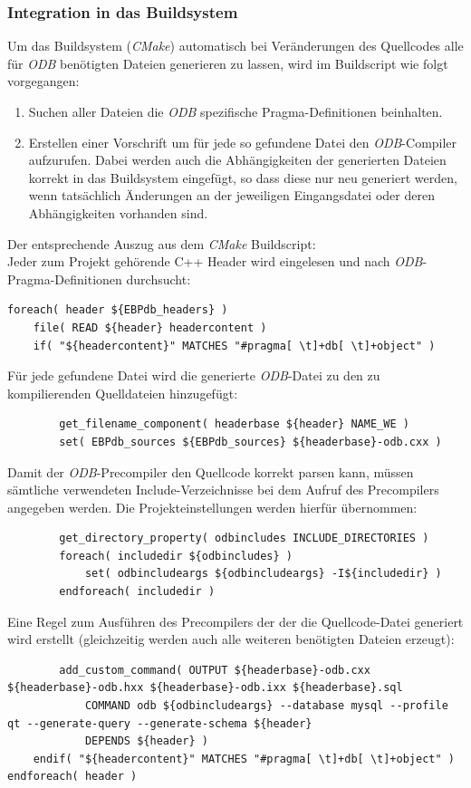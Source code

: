 \subsubsection{Integration in das Buildsystem}
Um das Buildsystem (\textit{CMake}) automatisch bei Veränderungen des Quellcodes alle für \textit{ODB} benötigten Dateien generieren zu lassen, wird im Buildscript wie folgt vorgegangen:
\begin{enumerate}
\item Suchen aller Dateien die \textit{ODB} spezifische Pragma-Definitionen beinhalten.
\item Erstellen einer Vorschrift um für jede so gefundene Datei den \textit{ODB}-Compiler aufzurufen.
	Dabei werden auch die Abhängigkeiten der generierten Dateien korrekt in das Buildsystem eingefügt, so dass diese nur neu generiert werden, wenn tatsächlich Änderungen an der jeweiligen Eingangsdatei oder deren Abhängigkeiten vorhanden sind.
\end{enumerate}
Der entsprechende Auszug aus dem \textit{CMake} Buildscript:\\
\lstset{language=clean}
Jeder zum Projekt gehörende C++ Header wird eingelesen und nach \textit{ODB}-Pragma-Definitionen durchsucht:
\begin{lstlisting}
foreach( header ${EBPdb_headers} )
	file( READ ${header} headercontent )
	if( "${headercontent}" MATCHES "#pragma[ \t]+db[ \t]+object" )
\end{lstlisting}
Für jede gefundene Datei wird die generierte \textit{ODB}-Datei zu den zu kompilierenden Quelldateien hinzugefügt:
\begin{lstlisting}
		get_filename_component( headerbase ${header} NAME_WE )
		set( EBPdb_sources ${EBPdb_sources} ${headerbase}-odb.cxx )
\end{lstlisting}
Damit der \textit{ODB}-Precompiler den Quellcode korrekt parsen kann, müssen sämtliche verwendeten Include-Verzeichnisse bei dem Aufruf des Precompilers angegeben werden. Die Projekteinstellungen werden hierfür übernommen:
\begin{lstlisting}
		get_directory_property( odbincludes INCLUDE_DIRECTORIES )
		foreach( includedir ${odbincludes} )
			set( odbincludeargs ${odbincludeargs} -I${includedir} )
		endforeach( includedir )
\end{lstlisting}
Eine Regel zum Ausführen des Precompilers der der die Quellcode-Datei generiert wird erstellt (gleichzeitig werden auch alle weiteren benötigten Dateien erzeugt):
\begin{lstlisting}
		add_custom_command( OUTPUT ${headerbase}-odb.cxx ${headerbase}-odb.hxx ${headerbase}-odb.ixx ${headerbase}.sql
			COMMAND odb ${odbincludeargs} --database mysql --profile qt --generate-query --generate-schema ${header}
			DEPENDS ${header} )
	endif( "${headercontent}" MATCHES "#pragma[ \t]+db[ \t]+object" )
endforeach( header )
\end{lstlisting}

